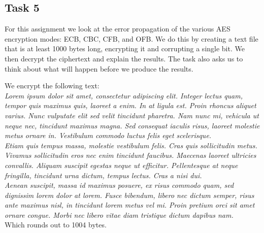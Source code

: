 \documentclass{article}
\begin{document}

\subsection{Task 5}
For this assignment we look at the error propagation of the various AES encryption
modes: ECB, CBC, CFB, and OFB. We do this by creating a text file that is at least
1000 bytes long, encrypting it and corrupting a single bit. We then decrypt
the ciphertext and explain the results. The task also asks us to
think about what will happen before we produce the results.

We encrypt the following text:\\
{\tiny \emph{
Lorem ipsum dolor sit amet, consectetur adipiscing elit. Integer lectus quam, tempor quis maximus quis, laoreet a enim. In at ligula est. Proin rhoncus aliquet varius. Nunc vulputate elit sed velit tincidunt pharetra. Nam nunc mi, vehicula ut neque nec, tincidunt maximus magna. Sed consequat iaculis risus, laoreet molestie metus ornare in. Vestibulum commodo luctus felis eget scelerisque.}\\
\emph{Etiam quis tempus massa, molestie vestibulum felis. Cras quis sollicitudin metus. Vivamus sollicitudin eros nec enim tincidunt faucibus. Maecenas laoreet ultricies convallis. Aliquam suscipit egestas neque ut efficitur. Pellentesque at neque fringilla, tincidunt urna dictum, tempus lectus. Cras a nisi dui.}\\
\emph{Aenean suscipit, massa id maximus posuere, ex risus commodo quam, sed dignissim lorem dolor at lorem. Fusce bibendum, libero nec dictum semper, risus ante maximus nisl, in tincidunt lorem metus vel mi. Proin pretium orci sit amet ornare congue. Morbi nec libero vitae diam tristique dictum dapibus nam. 
}}\\
Which rounds out to 1004 bytes.
\end{document}
